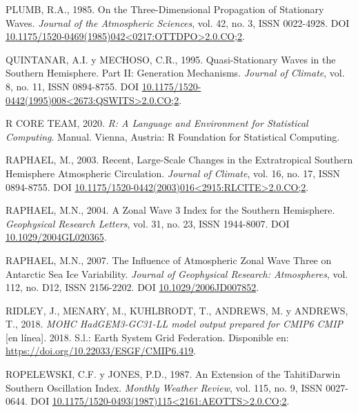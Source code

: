 \documentclass[12pt,oneside,a4paper]{reedthesis}
\newlength{\cslhangindent}
\newenvironment{CSLReferences}[2] %
 {%
  \setlength{\parindent}{0pt}
  \ifodd #1 \everypar{\setlength{\hangindent}{\cslhangindent}}\ignorespaces\fi
  \ifnum #2 > 0
  \setlength{\parskip}{#2\baselineskip}
  \fi
 }%
 {}
\begin{document}
\begin{CSLReferences}{1}{0}
\leavevmode{}%
PLUMB, R.A., 1985. On the {Three-Dimensional Propagation} of {Stationary Waves}. \emph{Journal of the Atmospheric Sciences}, vol. 42, no. 3, ISSN 0022-4928. DOI \href{https://doi.org/10.1175/1520-0469(1985)042\%3C0217:OTTDPO\%3E2.0.CO;2}{10.1175/1520-0469(1985)042\textless0217:OTTDPO\textgreater2.0.CO;2}.

\leavevmode{}%
QUINTANAR, A.I. y MECHOSO, C.R., 1995. Quasi-{Stationary Waves} in the {Southern Hemisphere}. {Part II}: {Generation Mechanisms}. \emph{Journal of Climate}, vol. 8, no. 11, ISSN 0894-8755. DOI \href{https://doi.org/10.1175/1520-0442(1995)008\%3C2673:QSWITS\%3E2.0.CO;2}{10.1175/1520-0442(1995)008\textless2673:QSWITS\textgreater2.0.CO;2}.

\leavevmode{}%
R CORE TEAM, 2020. \emph{R: {A} Language and Environment for Statistical Computing}. Manual. {Vienna, Austria}: {R Foundation for Statistical Computing}.

\leavevmode{}%
RAPHAEL, M., 2003. Recent, {Large-Scale Changes} in the {Extratropical Southern Hemisphere Atmospheric Circulation}. \emph{Journal of Climate}, vol. 16, no. 17, ISSN 0894-8755. DOI \href{https://doi.org/10.1175/1520-0442(2003)016\%3C2915:RLCITE\%3E2.0.CO;2}{10.1175/1520-0442(2003)016\textless2915:RLCITE\textgreater2.0.CO;2}.

\leavevmode{}%
RAPHAEL, M.N., 2004. A Zonal Wave 3 Index for the {Southern Hemisphere}. \emph{Geophysical Research Letters}, vol. 31, no. 23, ISSN 1944-8007. DOI \href{https://doi.org/10.1029/2004GL020365}{10.1029/2004GL020365}.

\leavevmode{}%
RAPHAEL, M.N., 2007. The Influence of Atmospheric Zonal Wave Three on {Antarctic} Sea Ice Variability. \emph{Journal of Geophysical Research: Atmospheres}, vol. 112, no. D12, ISSN 2156-2202. DOI \href{https://doi.org/10.1029/2006JD007852}{10.1029/2006JD007852}.

\leavevmode{}%
RIDLEY, J., MENARY, M., KUHLBRODT, T., ANDREWS, M. y ANDREWS, T., 2018. \emph{MOHC HadGEM3-GC31-LL model output prepared for CMIP6 CMIP} {[}en línea{]}. 2018. S.l.: Earth System Grid Federation. Disponible en: \url{https://doi.org/10.22033/ESGF/CMIP6.419}.

\leavevmode{}%
ROPELEWSKI, C.F. y JONES, P.D., 1987. An {Extension} of the {Tahiti}{\textendash}{Darwin Southern Oscillation Index}. \emph{Monthly Weather Review}, vol. 115, no. 9, ISSN 0027-0644. DOI \href{https://doi.org/10.1175/1520-0493(1987)115\%3C2161:AEOTTS\%3E2.0.CO;2}{10.1175/1520-0493(1987)115\textless2161:AEOTTS\textgreater2.0.CO;2}.


\end{CSLReferences}
\end{document}
